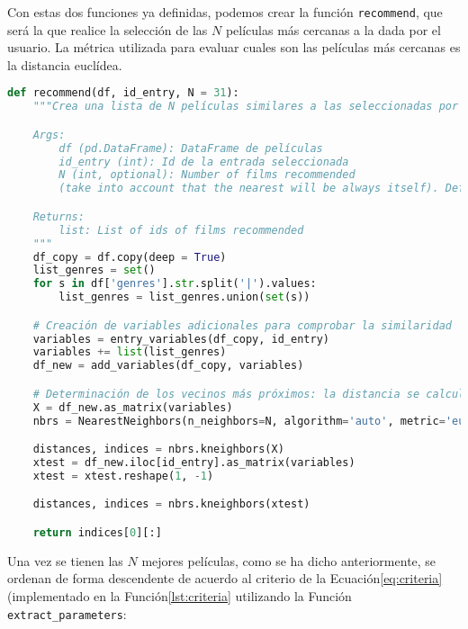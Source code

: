 Con estas dos funciones ya definidas, podemos crear la función \texttt{recommend}, que será la que realice la selección de las $N$ películas más cercanas a la dada por el usuario. La métrica utilizada para evaluar cuales son las películas más cercanas es la distancia euclídea.

\begin{lstlisting}[language=Python, caption=Obtención de las 30 mejores películas dada una por el usuario.]
def recommend(df, id_entry, N = 31):
    """Crea una lista de N películas similares a las seleccionadas por el usuario

    Args:
        df (pd.DataFrame): DataFrame de películas
        id_entry (int): Id de la entrada seleccionada
        N (int, optional): Number of films recommended 
        (take into account that the nearest will be always itself). Defaults to 31.

    Returns:
        list: List of ids of films recommended
    """
    df_copy = df.copy(deep = True)    
    list_genres = set()
    for s in df['genres'].str.split('|').values:
        list_genres = list_genres.union(set(s))    

    # Creación de variables adicionales para comprobar la similaridad
    variables = entry_variables(df_copy, id_entry)
    variables += list(list_genres)
    df_new = add_variables(df_copy, variables)

    # Determinación de los vecinos más próximos: la distancia se calcula con las nuevas vairables
    X = df_new.as_matrix(variables)
    nbrs = NearestNeighbors(n_neighbors=N, algorithm='auto', metric='euclidean').fit(X)

    distances, indices = nbrs.kneighbors(X)    
    xtest = df_new.iloc[id_entry].as_matrix(variables)
    xtest = xtest.reshape(1, -1)

    distances, indices = nbrs.kneighbors(xtest)

    return indices[0][:]
\end{lstlisting}

Una vez se tienen las $N$ mejores películas, como se ha dicho anteriormente, se ordenan de forma descendente de acuerdo al criterio de la Ecuación\ref{eq:criteria} (implementado en la Función\ref{lst:criteria} utilizando la Función \texttt{extract\_parameters}:

